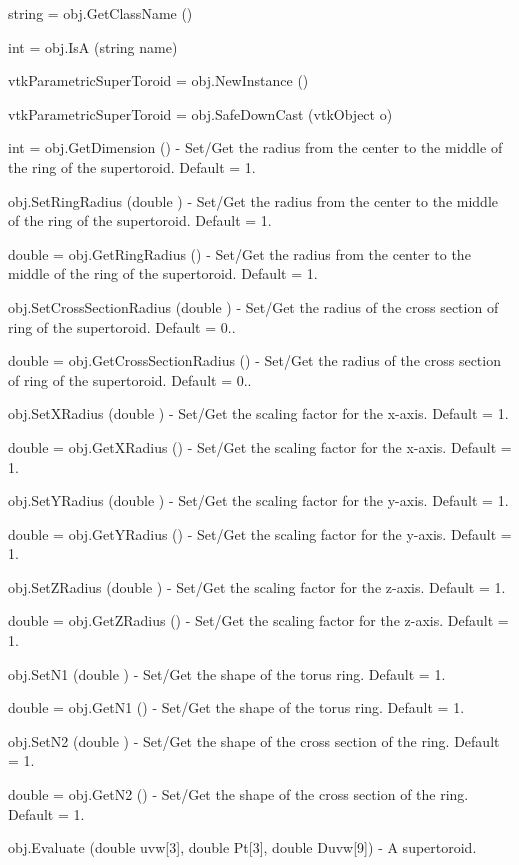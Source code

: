 \begin{DoxyItemize}
\item {\ttfamily string = obj.\-Get\-Class\-Name ()}  
\item {\ttfamily int = obj.\-Is\-A (string name)}  
\item {\ttfamily vtk\-Parametric\-Super\-Toroid = obj.\-New\-Instance ()}  
\item {\ttfamily vtk\-Parametric\-Super\-Toroid = obj.\-Safe\-Down\-Cast (vtk\-Object o)}  
\item {\ttfamily int = obj.\-Get\-Dimension ()} -\/ Set/\-Get the radius from the center to the middle of the ring of the supertoroid. Default = 1.  
\item {\ttfamily obj.\-Set\-Ring\-Radius (double )} -\/ Set/\-Get the radius from the center to the middle of the ring of the supertoroid. Default = 1.  
\item {\ttfamily double = obj.\-Get\-Ring\-Radius ()} -\/ Set/\-Get the radius from the center to the middle of the ring of the supertoroid. Default = 1.  
\item {\ttfamily obj.\-Set\-Cross\-Section\-Radius (double )} -\/ Set/\-Get the radius of the cross section of ring of the supertoroid. Default = 0..  
\item {\ttfamily double = obj.\-Get\-Cross\-Section\-Radius ()} -\/ Set/\-Get the radius of the cross section of ring of the supertoroid. Default = 0..  
\item {\ttfamily obj.\-Set\-X\-Radius (double )} -\/ Set/\-Get the scaling factor for the x-\/axis. Default = 1.  
\item {\ttfamily double = obj.\-Get\-X\-Radius ()} -\/ Set/\-Get the scaling factor for the x-\/axis. Default = 1.  
\item {\ttfamily obj.\-Set\-Y\-Radius (double )} -\/ Set/\-Get the scaling factor for the y-\/axis. Default = 1.  
\item {\ttfamily double = obj.\-Get\-Y\-Radius ()} -\/ Set/\-Get the scaling factor for the y-\/axis. Default = 1.  
\item {\ttfamily obj.\-Set\-Z\-Radius (double )} -\/ Set/\-Get the scaling factor for the z-\/axis. Default = 1.  
\item {\ttfamily double = obj.\-Get\-Z\-Radius ()} -\/ Set/\-Get the scaling factor for the z-\/axis. Default = 1.  
\item {\ttfamily obj.\-Set\-N1 (double )} -\/ Set/\-Get the shape of the torus ring. Default = 1.  
\item {\ttfamily double = obj.\-Get\-N1 ()} -\/ Set/\-Get the shape of the torus ring. Default = 1.  
\item {\ttfamily obj.\-Set\-N2 (double )} -\/ Set/\-Get the shape of the cross section of the ring. Default = 1.  
\item {\ttfamily double = obj.\-Get\-N2 ()} -\/ Set/\-Get the shape of the cross section of the ring. Default = 1.  
\item {\ttfamily obj.\-Evaluate (double uvw\mbox{[}3\mbox{]}, double Pt\mbox{[}3\mbox{]}, double Duvw\mbox{[}9\mbox{]})} -\/ A supertoroid.


\end{DoxyItemize}
